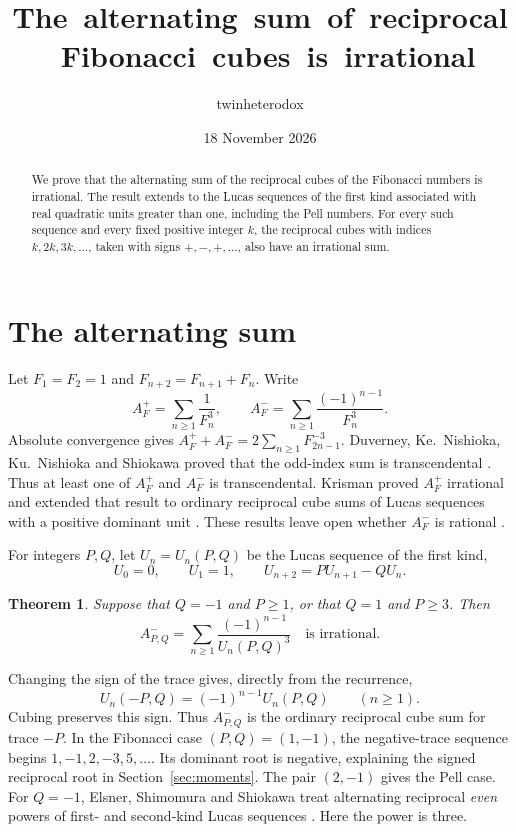 \documentclass[11pt,letterpaper]{article}
\title{\fontsize{16}{20}\selectfont\mbox{The alternating sum of reciprocal Fibonacci cubes is irrational}}
\author{twinheterodox}
\date{18 November 2026}
\newtheorem{theorem}{Theorem}[section]
\numberwithin{equation}{section}
\begin{document}
\maketitle

\begin{abstract}
We prove that the alternating sum of the reciprocal cubes of the Fibonacci numbers
is irrational. The result extends to the Lucas sequences of the first kind
associated with real quadratic units greater than one, including the Pell
numbers. For every such sequence and every fixed positive integer \(k\), the
reciprocal cubes with indices \(k,2k,3k,\ldots\), taken with signs
\(+,-,+,\ldots\), also have an irrational sum.
\end{abstract}

\section{The alternating sum}

Let \(F_1=F_2=1\) and \(F_{n+2}=F_{n+1}+F_n\). Write
\[
 A_F^+=\sum_{n\ge1}\frac{1}{F_n^3},\qquad
 A_F^-=\sum_{n\ge1}\frac{(-1)^{n-1}}{F_n^3}.
\]
Absolute convergence gives \(A_F^++A_F^-=2\sum_{n\ge1}F_{2n-1}^{-3}\).
Duverney, Ke.~Nishioka, Ku.~Nishioka and Shiokawa proved that the
odd-index sum is transcendental \cite{DNNS}\cite[Theorem~4, p.~95]{Kyoto}.
Thus at least one of \(A_F^+\) and \(A_F^-\) is transcendental.
Krisman proved \(A_F^+\) irrational \cite{KFib} and extended that
result to ordinary reciprocal cube sums of Lucas sequences with a
positive dominant unit \cite[Theorem~1.1]{KLucas}. These results
leave open whether \(A_F^-\) is rational \cite[p.~3]{KLucas}.

For integers \(P,Q\), let \(U_n=U_n(P,Q)\) be the Lucas sequence of the
first kind,
\[
 U_0=0,\qquad U_1=1,\qquad U_{n+2}=P U_{n+1}-Q U_n.
\]
\begin{theorem}\label{thm:main}
Suppose that \(Q=-1\) and \(P\ge1\), or that \(Q=1\) and \(P\ge3\).
Then
\[
                 A^-_{P,Q}=\sum_{n\ge1}\frac{(-1)^{n-1}}{U_n(P,Q)^3}
                 \quad\text{is irrational}.
\]
\end{theorem}
\noindent
Changing the sign of the trace gives, directly from the recurrence,
\[
   U_n(-P,Q)=(-1)^{n-1}U_n(P,Q)\qquad(n\ge1).
\]
Cubing preserves this sign. Thus \(A^-_{P,Q}\) is the ordinary
reciprocal cube sum for trace \(-P\). In the Fibonacci case
\((P,Q)=(1,-1)\), the negative-trace sequence begins \(1,-1,2,-3,5,\ldots\).
Its dominant root is negative, explaining the signed reciprocal root
in Section~\ref{sec:moments}. The pair \((2,-1)\) gives the Pell case.
For \(Q=-1\), Elsner, Shimomura and Shiokawa treat
alternating reciprocal \emph{even} powers of first- and second-kind
Lucas sequences \cite[Theorems~2 and~4]{ESS}. Here the power is three.
\end{document}
